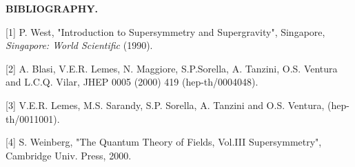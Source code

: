 \documentclass[a4paper,a4paper]{article}
\begin{document}
\vspace{4mm}

{\bf BIBLIOGRAPHY.}

[1] P. West, "Introduction to Supersymmetry and Supergravity", Singapore, {\it Singapore: World 
Scientific} (1990).

[2] A. Blasi, V.E.R. Lemes, N. Maggiore, S.P.Sorella, A. Tanzini, O.S. Ventura and  
L.C.Q. Vilar, JHEP 0005 (2000) 419 (hep-th/0004048).

[3] V.E.R. Lemes, M.S. Sarandy, S.P. Sorella, A. Tanzini and O.S. Ventura, (hep-th/0011001).

[4] S. Weinberg, "The Quantum Theory of Fields, Vol.III Supersymmetry", Cambridge Univ. Press, 2000.  



\enddocument
\end{document}
